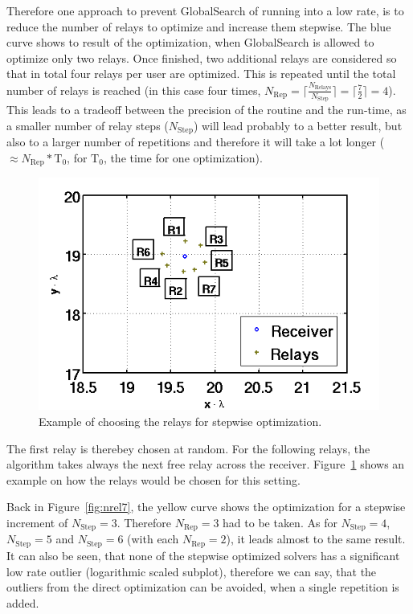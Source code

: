 Therefore one approach to prevent GlobalSearch of running into a low rate, is to reduce the number of relays to optimize and increase them stepwise.
The blue curve shows to result of the optimization, when GlobalSearch is allowed to optimize only two relays.
Once finished, two additional relays are considered so that in total four relays per user are optimized.
This is repeated until the total number of relays is reached (in this case four times, $N_{\text{Rep}} = \lceil\frac{N_{\text{Relays}}}{N_{\text{Step}}}\rceil = \lceil\frac{7}{2}\rceil=4$).
This leads to a tradeoff between the precision of the routine and the run-time, as a smaller number of relay steps ($ N_{\text{Step}}$) will lead probably to a better result, but also to a larger number of repetitions and therefore it will take a lot longer ($\approx N_{\text{Rep}}*\text{T}_0$, for $\text{T}_0$, the time for one optimization).

\begin{figure}[h]
\centering
  \includegraphics[width=0.6\linewidth]{images/choice_of_relays.png}
\caption{Example of choosing the relays for stepwise optimization.}
\label{fig:rel_choice}
\end{figure}

The first relay is therebey chosen at random.
For the following relays, the algorithm takes always the next free relay across the receiver.
Figure~\ref{fig:rel_choice} shows an example on how the relays would be chosen for this setting.

Back in Figure~\ref{fig:nrel7}, the yellow curve shows the optimization for a stepwise increment of $N_{\text{Step}}=3$.
Therefore $N_{\text{Rep}} = 3$ had to be taken.
As for $N_{\text{Step}}=4$, $N_{\text{Step}}=5$ and $N_{\text{Step}}=6$ (with each $N_{\text{Rep}} = 2$), it leads almost to the same result.
It can also be seen, that none of the stepwise optimized solvers has a significant low rate outlier (logarithmic scaled subplot), therefore we can say, that the outliers from the direct optimization can be avoided, when a single repetition is added.

